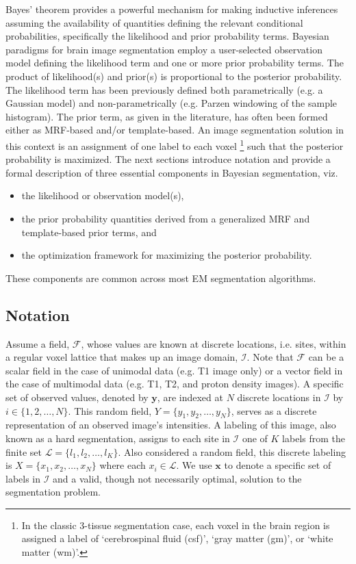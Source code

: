 \documentclass[11pt,english]{article}
\begin{document}
Bayes' theorem provides a powerful mechanism for making inductive
inferences assuming the availability of quantities defining the
relevant conditional probabilities, specifically the likelihood and
prior probability terms.  Bayesian paradigms for brain image
segmentation employ a user-selected observation model defining the
likelihood term and one or more prior probability terms.  The product
of likelihood(s) and prior(s) is proportional to the posterior
probability.  The likelihood term has been previously defined both 
parametrically (e.g. a Gaussian model) and non-parametrically
(e.g. Parzen windowing of the sample histogram).  The prior term, as
given in the literature, has often been formed either as
MRF-based and/or template-based.  An image segmentation solution in this
context is an assignment of one label to each voxel%
\footnote{
In the classic 3-tissue segmentation case, each voxel in the brain region is assigned a label of `cerebrospinal fluid (csf)', `gray matter (gm)', or `white matter (wm)'. 
}
such that the posterior probability is maximized.  The next sections
introduce notation and provide a formal description of three essential
components in Bayesian segmentation, viz.
\begin{itemize}
  \item the likelihood or observation model(s),
  \item the prior probability quantities derived from a generalized
    MRF and template-based prior terms, and 
  \item the optimization framework for maximizing the posterior probability.
\end{itemize}
These components are common across most EM segmentation algorithms. 

\subsection{Notation}
Assume a field, $\mathcal{F}$, whose values are known at discrete
locations, i.e. sites, within a regular voxel lattice that makes up an
image domain, $\mathcal{I}$.  Note that $\mathcal{F}$ can be a scalar
field in the case of unimodal data (e.g. T1 image only) or a vector
field in the case of multimodal data (e.g. T1, T2, and proton density
images).  A specific set of observed values, denoted by $\mathbf{y}$,
are indexed at $N$ discrete locations in $\mathcal{I}$ by $i \in \{1,
2, \ldots, N\}$.  This random field, $Y = \{y_1, y_2, \ldots, y_N \}$,
serves as a discrete representation of an observed image's intensities.  A labeling
of this image, also known as a hard segmentation, assigns to each site
in $\mathcal{I}$ one of $K$ labels from the finite set $\mathcal{L} =
\{l_1, l_2, \ldots, l_K\}$.  Also considered a random field, this
discrete labeling is $X = \{x_1, x_2, \ldots, x_N\}$ where each
$x_i \in \mathcal{L}$.   We use $\mathbf{x}$ to denote a specific set of labels in
$\mathcal{I}$ and a valid, though not necessarily optimal, solution to the segmentation problem.
\end{document}

